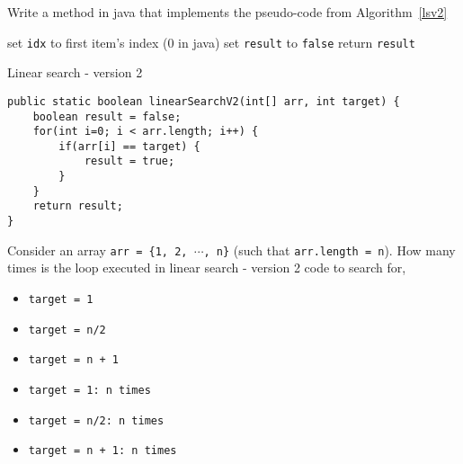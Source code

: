 \begin{exercise}
Write a method in java that implements the pseudo-code from Algorithm~\ref{lsv2}

\IncMargin{1em}
\begin{algorithm}[H]
	\SetAlgoLined
{}
set \texttt{idx} to first item's index (0 in java)\;
set \texttt{result} to \texttt{false}\;
return \texttt{result}\;
\caption{Linear search - version 2 \label{lsv2}}
\end{algorithm}
\end{exercise}
\begin{answer}
\begin{lstlisting}
public static boolean linearSearchV2(int[] arr, int target) {
	boolean result = false;
	for(int i=0; i < arr.length; i++) {
		if(arr[i] == target) {
			result = true;
		}
	}
	return result;
}
\end{lstlisting}	
\end{answer}
 
\begin{exercise}
Consider an array \texttt{arr = \{1, 2, $\cdots$, n\}} (such that \texttt{arr.length = n}). How many times is the loop executed in linear search - version 2 code to search for,

\begin{itemize}
\item \texttt{target = 1}	
\item \texttt{target = n/2}	
\item \texttt{target = n + 1}	
\end{itemize}	
\end{exercise}
\begin{answer}
\begin{itemize}
\item \texttt{target = 1: n times}
\item \texttt{target = n/2: n times}
\item \texttt{target = n + 1: n times}
\end{itemize}
\end{answer}

